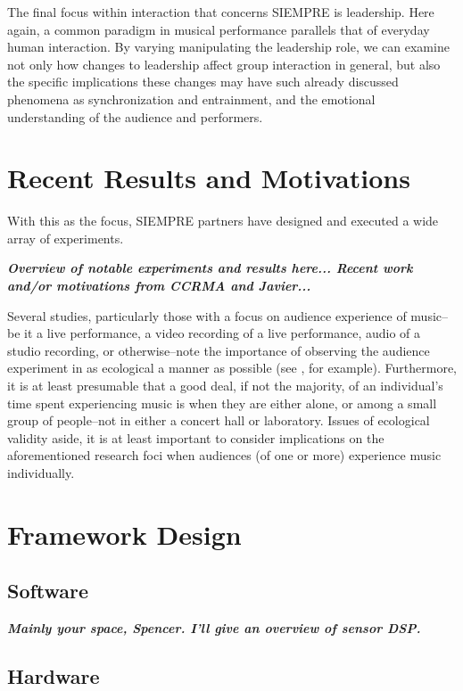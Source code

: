 \documentclass{sig-alternate}
\begin{document}
The final focus within interaction that concerns SIEMPRE is leadership.  Here again, a common paradigm in musical performance parallels that of everyday human interaction.  By varying manipulating the leadership role, we can examine not only how changes to leadership affect group interaction in general, but also the specific implications these changes may have such already discussed phenomena as synchronization and entrainment, and the emotional understanding of the audience and performers.

\section{Recent Results and Motivations}
With this as the focus, SIEMPRE partners have designed and executed a wide array of experiments.

\vspace{12pt}
\textbf{\textit{Overview of notable experiments and results here...  Recent work and/or motivations from CCRMA and Javier...}}
\vspace{12pt}

Several studies, particularly those with a focus on audience experience of music--be it a live performance, a video recording of a live performance, audio of a studio recording, or otherwise--note the importance of observing the audience experiment in as ecological a manner as possible (see \cite{Jaimovich:2012vr}, for example).  Furthermore, it is at least presumable that a good deal, if not the majority, of an individual's time spent experiencing music is when they are either alone, or among a small group of people--not in either a concert hall or laboratory.  Issues of ecological validity aside, it is at least important to consider implications on the aforementioned research foci when audiences (of one or more) experience music individually.

\section{Framework Design}
\subsection{Software}
\vspace{12pt}
\textbf{\textit{Mainly your space, Spencer.  I'll give an overview of sensor DSP.}}
\vspace{12pt}
\subsection{Hardware}
\end{document}
